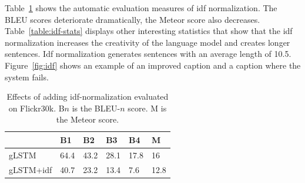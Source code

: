 \documentclass[twoside,twocolumn]{article}
\begin{document}
	Table~\ref{table:results_idf} shows the automatic evaluation measures of idf normalization. The BLEU scores deteriorate dramatically, the Meteor score also decreases. Table~\ref{table:idf-stats} displays other interesting statistics that show that the idf normalization increases the creativity of the language model and creates longer sentences. Idf normalization generates sentences with an average length of 10.5. Figure~\ref{fig:idf} shows an example of an improved caption and a caption where the system fails.
	
	\begin{table}
		\centering
		\begin{tabular}{llllll}
			~                  & B1 & B2 & B3 & B4 & M \\ \hline
			gLSTM        & 64.4   & 43.2            & 28.1   & 17.8   & 16 \\
			gLSTM+idf   & 40.7   & 23.2   & 13.4   & 7.6 & 12.8 \\ \hline
			
		\end{tabular}
		
		\caption{Effects of adding idf-normalization evaluated on Flickr30k. B$n$ is the BLEU-$n$ score. M is the Meteor score.}
		\label{table:results_idf}
	\end{table}
	
\end{document}
